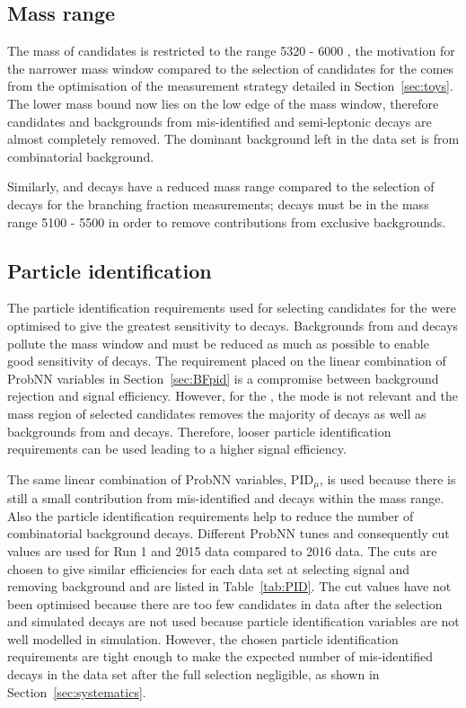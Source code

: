 \subsection{Mass range}
\label{sec:ELmass}
The mass of \bsmumu candidates is restricted to the range 5320 - 6000 \mevcc, the motivation for the narrower mass window compared to the selection of candidates for the \BFm comes from the optimisation of the measurement strategy detailed in Section~\ref{sec:toys}. The lower mass bound now lies on the low edge of the \bs mass window, therefore \bdmumu candidates and backgrounds from mis-identified \bhh and semi-leptonic decays are almost completely removed. The dominant background left in the data set is from combinatorial background. %

Similarly, \bdkpi and \bskk decays have a reduced mass range compared to the selection of \bhh decays for the branching fraction measurements; \bhh decays must be in the mass range 5100 - 5500 \mevcc in order to remove contributions from exclusive backgrounds.

\subsection{Particle identification}
\label{sec:ELpid}
The particle identification requirements used for selecting candidates for the \BFm were optimised to give the greatest sensitivity to \bdmumu decays. Backgrounds from \bhh and \lambdab decays pollute the \bd mass window and must be reduced as much as possible to enable good sensitivity of \bdmumu decays. The requirement placed on the linear combination of ProbNN variables in Section~\ref{sec:BFpid} is a compromise between background rejection and signal efficiency. However, for the \elm, the \bd mode is not relevant and the mass region of selected candidates removes the majority of \bdmumu decays as well as backgrounds from \bhh and \lambdab decays. Therefore, looser particle identification requirements can be used leading to a higher signal efficiency.%

The same linear combination of ProbNN variables, PID$_{\mu}$, is used because there is still a small contribution from mis-identified \bhh and \lambdab decays within the mass range. Also the particle identification requirements help to reduce the number of combinatorial background decays. Different ProbNN tunes and consequently cut values are used for Run 1 and 2015 data compared to 2016 data. The cuts are chosen to give similar efficiencies for each data set at selecting signal and removing background and are listed in Table~\ref{tab:PID}. The cut values have not been optimised because there are too few candidates in data after the selection and simulated decays are not used because particle identification variables are not well modelled in simulation. However, the chosen particle identification requirements are tight enough to make the expected number of mis-identified decays in the data set after the full selection negligible, as shown in Section~\ref{sec:systematics}. 

